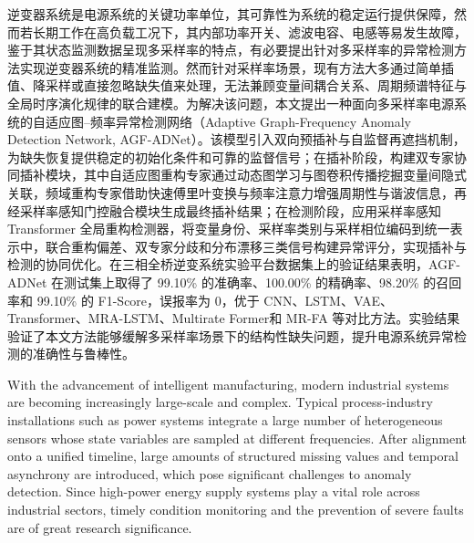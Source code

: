 \documentclass[bachelor, vlined]{DissertUESTC}
\begin{document}
    逆变器系统是电源系统的关键功率单位，其可靠性为系统的稳定运行提供保障，然而若长期工作在高负载工况下，其内部功率开关、滤波电容、电感等易发生故障，鉴于其状态监测数据呈现多采样率的特点，有必要提出针对多采样率的异常检测方法实现逆变器系统的精准监测。然而针对采样率场景，现有方法大多通过简单插值、降采样或直接忽略缺失值来处理，无法兼顾变量间耦合关系、周期频谱特征与全局时序演化规律的联合建模。为解决该问题，本文提出一种面向多采样率电源系统的自适应图--频率异常检测网络（Adaptive Graph-Frequency Anomaly Detection Network, AGF-ADNet）。该模型引入双向预插补与自监督再遮挡机制，为缺失恢复提供稳定的初始化条件和可靠的监督信号；在插补阶段，构建双专家协同插补模块，其中自适应图重构专家通过动态图学习与图卷积传播挖掘变量间隐式关联，频域重构专家借助快速傅里叶变换与频率注意力增强周期性与谐波信息，再经采样率感知门控融合模块生成最终插补结果；在检测阶段，应用采样率感知 Transformer 全局重构检测器，将变量身份、采样率类别与采样相位编码到统一表示中，联合重构偏差、双专家分歧和分布漂移三类信号构建异常评分，实现插补与检测的协同优化。在三相全桥逆变系统实验平台数据集上的验证结果表明，AGF-ADNet 在测试集上取得了 99.10\% 的准确率、100.00\% 的精确率、98.20\% 的召回率和 99.10\% 的 F1-Score，误报率为 0，优于 CNN、LSTM、VAE、Transformer、MRA-LSTM、Multirate Former和 MR-FA 等对比方法。实验结果验证了本文方法能够缓解多采样率场景下的结构性缺失问题，提升电源系统异常检测的准确性与鲁棒性。

	
	\enabstract
	With the advancement of intelligent manufacturing, modern industrial systems are becoming increasingly large-scale and complex. Typical process-industry installations such as power systems integrate a large number of heterogeneous sensors whose state variables are sampled at different frequencies. After alignment onto a unified timeline, large amounts of structured missing values and temporal asynchrony are introduced, which pose significant challenges to anomaly detection. Since high-power energy supply systems play a vital role across industrial sectors, timely condition monitoring and the prevention of severe faults are of great research significance.
\end{document}
